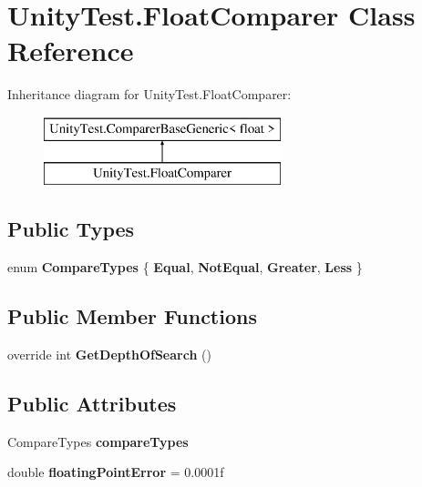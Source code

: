 \hypertarget{class_unity_test_1_1_float_comparer}{}\section{Unity\+Test.\+Float\+Comparer Class Reference}
\label{class_unity_test_1_1_float_comparer}
Inheritance diagram for Unity\+Test.\+Float\+Comparer\+:\begin{figure}[H]
\begin{center}
\leavevmode
\includegraphics[height=2.000000cm]{class_unity_test_1_1_float_comparer}
\end{center}
\end{figure}
\subsection*{Public Types}
\begin{DoxyCompactItemize}
\item 
\mbox{\label{class_unity_test_1_1_float_comparer_a780be80dce1a357565f38979714d6dcd}} 
enum {\bfseries Compare\+Types} \{ {\bfseries Equal}, 
{\bfseries Not\+Equal}, 
{\bfseries Greater}, 
{\bfseries Less}
 \}
\end{DoxyCompactItemize}
\subsection*{Public Member Functions}
\begin{DoxyCompactItemize}
\item 
\mbox{\label{class_unity_test_1_1_float_comparer_a2fb5bc5633f7f7e5903487b722227be4}} 
override int {\bfseries Get\+Depth\+Of\+Search} ()
\end{DoxyCompactItemize}
\subsection*{Public Attributes}
\begin{DoxyCompactItemize}
\item 
\mbox{\label{class_unity_test_1_1_float_comparer_aa17d17489d7d74841d46b9dc0ae9ed76}} 
Compare\+Types {\bfseries compare\+Types}
\item 
\mbox{\label{class_unity_test_1_1_float_comparer_a09be4ea97569c38cb93a2ff4e83ed8d2}} 
double {\bfseries floating\+Point\+Error} = 0.\+0001f
\end{DoxyCompactItemize}
